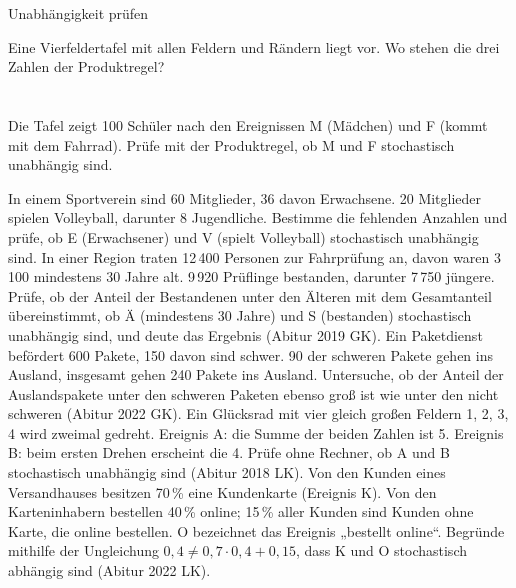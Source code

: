 \begin{aufgabe}{Unabhängigkeit prüfen}
\begin{teile}
\teil Eine Vierfeldertafel mit allen Feldern und Rändern liegt vor. Wo stehen die drei Zahlen der Produktregel? \\  \\  \\ 
\teil Die Tafel zeigt 100 Schüler nach den Ereignissen M (Mädchen) und F (kommt mit dem Fahrrad). Prüfe mit der Produktregel, ob M und F stochastisch unabhängig sind.

\teil In einem Sportverein sind 60 Mitglieder, 36 davon Erwachsene. 20 Mitglieder spielen Volleyball, darunter 8 Jugendliche. Bestimme die fehlenden Anzahlen und prüfe, ob E (Erwachsener) und V (spielt Volleyball) stochastisch unabhängig sind.
\teil In einer Region traten 12\,400 Personen zur Fahrprüfung an, davon waren 3\,100 mindestens 30 Jahre alt. 9\,920 Prüflinge bestanden, darunter 7\,750 jüngere. Prüfe, ob der Anteil der Bestandenen unter den Älteren mit dem Gesamtanteil übereinstimmt, ob Ä (mindestens 30 Jahre) und S (bestanden) stochastisch unabhängig sind, und deute das Ergebnis \hfill (Abitur 2019 GK).
\teil Ein Paketdienst befördert 600 Pakete, 150 davon sind schwer. 90 der schweren Pakete gehen ins Ausland, insgesamt gehen 240 Pakete ins Ausland. Untersuche, ob der Anteil der Auslandspakete unter den schweren Paketen ebenso groß ist wie unter den nicht schweren \hfill (Abitur 2022 GK).
\teil Ein Glücksrad mit vier gleich großen Feldern 1, 2, 3, 4 wird zweimal gedreht. Ereignis A: die Summe der beiden Zahlen ist 5. Ereignis B: beim ersten Drehen erscheint die 4. Prüfe ohne Rechner, ob A und B stochastisch unabhängig sind \hfill (Abitur 2018 LK).
\teil Von den Kunden eines Versandhauses besitzen 70\,\% eine Kundenkarte (Ereignis K). Von den Karteninhabern bestellen 40\,\% online; 15\,\% aller Kunden sind Kunden ohne Karte, die online bestellen. O bezeichnet das Ereignis „bestellt online“. Begründe mithilfe der Ungleichung $0{,}4 \ne 0{,}7 \cdot 0{,}4 + 0{,}15$, dass K und O stochastisch abhängig sind \hfill (Abitur 2022 LK).
\end{teile}
\end{aufgabe}


